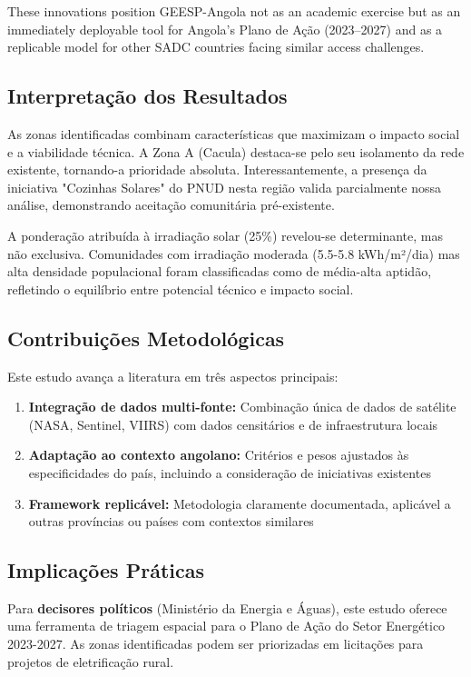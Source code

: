 \documentclass[12pt, a4paper]{article}
\begin{document}
\begin{itemize}
These innovations position GEESP-Angola not as an academic exercise but as an immediately deployable tool for Angola's Plano de Ação (2023--2027) and as a replicable model for other SADC countries facing similar access challenges.
\subsection{Interpretação dos Resultados}

As zonas identificadas combinam características que maximizam o impacto social e a viabilidade técnica. A Zona A (Cacula) destaca-se pelo seu isolamento da rede existente, tornando-a prioridade absoluta. Interessantemente, a presença da iniciativa "Cozinhas Solares" do PNUD nesta região valida parcialmente nossa análise, demonstrando aceitação comunitária pré-existente.

A ponderação atribuída à irradiação solar (25\%) revelou-se determinante, mas não exclusiva. Comunidades com irradiação moderada (5.5-5.8 kWh/m²/dia) mas alta densidade populacional foram classificadas como de média-alta aptidão, refletindo o equilíbrio entre potencial técnico e impacto social.

\subsection{Contribuições Metodológicas}

Este estudo avança a literatura em três aspectos principais:
\begin{enumerate}
    \item \textbf{Integração de dados multi-fonte:} Combinação única de dados de satélite (NASA, Sentinel, VIIRS) com dados censitários e de infraestrutura locais
    \item \textbf{Adaptação ao contexto angolano:} Critérios e pesos ajustados às especificidades do país, incluindo a consideração de iniciativas existentes
    \item \textbf{Framework replicável:} Metodologia claramente documentada, aplicável a outras províncias ou países com contextos similares
\end{enumerate}

\subsection{Implicações Práticas}

Para \textbf{decisores políticos} (Ministério da Energia e Águas), este estudo oferece uma ferramenta de triagem espacial para o Plano de Ação do Setor Energético 2023-2027. As zonas identificadas podem ser priorizadas em licitações para projetos de eletrificação rural.


\end{itemize}
\end{document}
